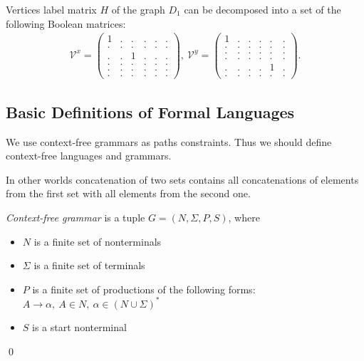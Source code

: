 Vertices label matrix $H$ of the graph $D_1$ can be decomposed into a set of the following Boolean matrices:
{
    \renewcommand{\arraystretch}{0.7}
    \setlength\arraycolsep{2pt}
\begin{align*}
\mathcal{V}^x =
\begin{pmatrix}
    1 & . & . & . & . & . \\
    . & . & . & . & . & . \\
    . & . & 1 & . & . & . \\
    . & . & . & . & . & . \\ 
    . & . & . & . & . & . \\ 
    . & . & . & . & . & .
\end{pmatrix},~ 
\mathcal{V}^y =
\begin{pmatrix}
    1 & . & . & . & . & . \\
    . & . & . & . & . & . \\
    . & . & . & . & . & . \\
    . & . & . & . & . & . \\ 
    . & . & . & . & 1 & . \\ 
    . & . & . & . & . & .
\end{pmatrix}.
\end{align*}
}

\subsection{Basic Definitions of Formal Languages}
We use context-free grammars as paths constraints. Thus we should define context-free languages and grammars.



In other worlds concatenation of two sets contains all concatenations of elements from the first set with all elements from the second one.

\begin{definition}\emph{Context-free grammar} is a tuple $G=(N, \Sigma, P, S)$, where 
\begin{itemize}
    \item $N$ is a finite set of nonterminals
    \item $\Sigma$ is a finite set of terminals
    \item $P$ is a finite set of productions of the following forms: $A \to \alpha, ~A \in N,~ \alpha \in (N \cup \Sigma)^*$
    \item $S$ is a start nonterminal
\end{itemize} \qed
\end{definition}


